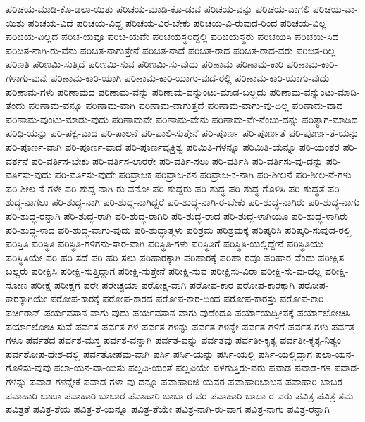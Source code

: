 {ಪರಿಚಯ-ಮಾಡಿ-ಕೊ-ಡಲಾ-ಯಿತು
ಪರಿಚಯ-ಮಾಡಿ-ಕೊ-ಡುವ
ಪರಿಚಯ-ವನ್ನು
ಪರಿಚಯ-ವಾಗಲಿ
ಪರಿಚಯ-ವಾ-ಯಿತು
ಪರಿಚಯ-ವಿದೆ
ಪರಿಚಯ-ವಿದ್ದ
ಪರಿಚಯ-ವಿರ-ಬೇಕು
ಪರಿಚಯ-ವಿ-ರುವುದ-ರಿಂದ
ಪರಿಚಯ-ವಿಲ್ಲ
ಪರಿಚಯ-ವಿಲ್ಲದ
ಪರಿಚ-ಯವೂ
ಪರಿಚ-ಯವೇ
ಪರಿಚಯಸ್ಥರಿದ್ದಲ್ಲಿ
ಪರಿಚಯಸ್ಥರು
ಪರಿಚಯಿಸಿ
ಪರಿಚಯಿ-ಸಿದ
ಪರಿಚಿತ-ನಾಗಿ-ರು-ವೆನು
ಪರಿಚಿತ-ನಾಗುತ್ತೇನೆ
ಪರಿಚಿತ-ನಾದೆ
ಪರಿಚಿತ-ರಾದ
ಪರಿಚಿತ-ರಾದ-ವರು
ಪರಿಚಿತ-ರಿಲ್ಲ
ಪರಿಣತಿ
ಪರಿಣಮಿ-ಸುತ್ತಿದೆ
ಪರಿಣಮಿ-ಸುವ
ಪರಿಣಮಿ-ಸು-ವುದು
ಪರಿಣಾಮ
ಪರಿಣಾಮ-ಕಾರಿ
ಪರಿಣಾಮ-ಕಾರಿ-ಗಳಾಗು-ವುವು
ಪರಿಣಾಮ-ಕಾರಿ-ಯಾಗಿ
ಪರಿಣಾಮ-ಕಾರಿ-ಯಾಗು-ವುದ-ರಲ್ಲಿ
ಪರಿಣಾಮ-ಕಾರಿ-ಯಾಗು-ವುದು
ಪರಿಣಾಮ-ಗಳು
ಪರಿಣಾಮದ
ಪರಿಣಾಮ-ವನ್ನು
ಪರಿಣಾಮ-ವನ್ನುಂಟು-ಮಾಡ-ಬಲ್ಲದು
ಪರಿಣಾಮ-ವನ್ನುಂಟು-ಮಾಡಿ-ತೆಂದು
ಪರಿಣಾಮ-ವನ್ನೂ
ಪರಿಣಾಮ-ವಾಗಿ
ಪರಿಣಾಮ-ವಾಗುತ್ತದೆ
ಪರಿಣಾಮ-ವಾಗು-ವು-ದಿಲ್ಲ
ಪರಿಣಾಮ-ವಾದ
ಪರಿಣಾಮ-ವುಂಟು-ಮಾಡು-ವುದು
ಪರಿಣಾಮವೇ
ಪರಿಣಾಮ-ವೇನು
ಪರಿಣಾಮ-ವೇ-ನೆಂಬು-ದನ್ನು
ಪರಿತ್ಯಾಗ-ಮಾಡಿದ
ಪರಿಧಿ-ಯನ್ನು
ಪರಿ-ಪಕ್ವ-ವಾದ
ಪರಿ-ಪಾಲನೆ
ಪರಿ-ಪಾಲಿ-ಸುತ್ತೇನೆ
ಪರಿ-ಪೂರ್ಣ
ಪರಿ-ಪೂರ್ಣತೆ
ಪರಿ-ಪೂರ್ಣ-ತೆ-ಯನ್ನು
ಪರಿ-ಪೂರ್ಣ-ವಾಗಿ
ಪರಿ-ಪೂರ್ಣ-ವಾದ
ಪರಿ-ಪೂರ್ಣವ್ಯಕ್ತಿತ್ವ
ಪರಿಮಿತಿ-ಗಳನ್ನೂ
ಪರಿಮಿತಿ-ಯನ್ನೂ
ಪರಿ-ಯಂತರ
ಪರಿ-ವರ್ತನೆ
ಪರಿ-ವರ್ತಿಸ-ಬೇಕು
ಪರಿ-ವರ್ತಿಸ-ಲಾರರೇ
ಪರಿ-ವರ್ತಿ-ಸಲು
ಪರಿ-ವರ್ತಿಸಿ
ಪರಿ-ವರ್ತಿಸು-ವು-ದನ್ನು
ಪರಿ-ವರ್ತಿಸು-ವುದು
ಪರಿ-ವರ್ತಿಸು-ವುದೇ
ಪರಿವ್ರಾಜಕ
ಪರಿವ್ರಾಜ-ಕನ
ಪರಿವ್ರಾಜ-ಕ-ನಾಗಿ
ಪರಿ-ಶೀಲನೆ
ಪರಿ-ಶೀಲ-ನೆ-ಗಳು
ಪರಿ-ಶೀಲ-ನೆ-ಗಳೇ
ಪರಿ-ಶುದ್ದ-ನಾಗಿ-ರು-ವನೋ
ಪರಿ-ಶುದ್ದರು
ಪರಿ-ಶುದ್ಧ
ಪರಿ-ಶುದ್ಧ-ಗೊಳಿಸಿ
ಪರಿ-ಶುದ್ಧತೆ
ಪರಿ-ಶುದ್ಧ-ನಾಗಲು
ಪರಿ-ಶುದ್ಧ-ನಾಗಿ
ಪರಿ-ಶುದ್ಧ-ನಾಗಿದ್ದರೆ
ಪರಿ-ಶುದ್ಧ-ನಾಗಿ-ರ-ಬೇಕು
ಪರಿ-ಶುದ್ಧ-ನಾಗಿರು
ಪರಿ-ಶುದ್ಧ-ನಾಗು
ಪರಿ-ಶುದ್ಧ-ರನ್ನಾಗಿ
ಪರಿ-ಶುದ್ಧ-ರಾಗಿ
ಪರಿ-ಶುದ್ಧ-ರಾಗಿರಿ
ಪರಿ-ಶುದ್ಧ-ರಾದ
ಪರಿ-ಶುದ್ಧ-ಳಾಗಿಯೂ
ಪರಿ-ಶುದ್ಧ-ಳಾಗಿರು
ಪರಿ-ಶುದ್ಧ-ಳಾದ
ಪರಿ-ಶುದ್ಧ-ವಾಗು-ವುದು
ಪರಿ-ಶುದ್ಧಾತ್ಮಳು
ಪರಿಶ್ರಮ
ಪರಿಶ್ರಮಕ್ಕೆ
ಪರಿಷ್ಕರಿಸಿ
ಪರಿಷ್ಕರಿ-ಸುವುದ-ರಲ್ಲಿ
ಪರಿಸ್ತಿತಿ
ಪರಿಸ್ಥಿತಿ
ಪರಿಸ್ಥಿತಿ-ಗಳಿಗನು-ಸಾರ-ವಾಗಿ
ಪರಿಸ್ಥಿತಿ-ಗಳು
ಪರಿಸ್ಥಿತಿಗೆ
ಪರಿಸ್ಥಿತಿ-ಯಲ್ಲಿದ್ದೇನೆ
ಪರಿಸ್ಥಿತಿಯು
ಪರಿಸ್ಥಿತಿಯೇ
ಪರಿ-ಹರಿ-ಸದೆ
ಪರಿ-ಹರಿ-ಸಲು
ಪರಿಹಾರಕ್ಕಾಗಿ
ಪರಿಹಾರಕ್ಕೆ
ಪರಿಹಾ-ರವೂ
ಪರಿಹಾರ-ವೆಂದು
ಪರೀಕ್ಷಿಸ-ಬಲ್ಲರು
ಪರೀಕ್ಷಿಸಿ
ಪರೀಕ್ಷಿ-ಸುತ್ತಿದ್ದಾಗ
ಪರೀಕ್ಷಿ-ಸುತ್ತೇನೆ
ಪರೀಕ್ಷಿ-ಸುವ
ಪರೀಕ್ಷಿಸು-ವಿರಾ
ಪರೀಕ್ಷಿ-ಸು-ವು-ದಲ್ಲ
ಪರೀಕ್ಷಿ-ಸೋಣ
ಪರೀಕ್ಷೆ
ಪರೀಕ್ಷೆಗೆ
ಪರೇ
ಪರೇಚ್ಛಯಾ
ಪರೋಕ್ಷ-ವಾಗಿ
ಪರೋಪ-ಕಾರ
ಪರೋಪ-ಕಾರಕ್ಕಾಗಿ
ಪರೋಪ-ಕಾರಕ್ಕಾಗಿಯೇ
ಪರೋಪ-ಕಾರಕ್ಕೆ
ಪರೋಪ-ಕಾರದ
ಪರೋಪ-ಕಾರ-ದಿಂದ
ಪರೋಪ-ಕಾರಸ್ತು
ಪರೋಪ-ಕಾರಿ
ಪರ್ಚಿರಾನ್
ಪರ್ಯವಸಾನ-ವಾಗು-ವುದು
ಪರ್ಯವಸಾನ-ವಾಗು-ವುದೆಂದೂ
ಪರ್ಯಾಯದ್ವೀಪಕ್ಕೆ
ಪರ್ಯಾಲೋಚಿಸಿ
ಪರ್ಯಾಲೋಚಿ-ಸುವೆ
ಪರ್ವತ
ಪರ್ವತ-ಗಳ
ಪರ್ವತ-ಗಳನ್ನು
ಪರ್ವತ-ಗಳನ್ನೇ
ಪರ್ವತ-ಗಳಿಗೆ
ಪರ್ವತ-ಗಳು
ಪರ್ವತ-ಗಳೂ
ಪರ್ವತದ
ಪರ್ವತ-ಮಸ್ತ
ಪರ್ವತ-ವನ್ನಾಗಿ
ಪರ್ವತ-ವನ್ನು
ಪರ್ವತವು
ಪರ್ವತೀ-ಕೃತ್ಯ
ಪರ್ವತೀ-ಕೃತ್ಯ-ನಿತ್ಯಂ
ಪರ್ವತೋಪ-ದೇಶ-ದಲ್ಲಿ
ಪರ್ವತೋಪಮ-ವಾಗಿ
ಪರ್ಸಿ
ಪರ್ಸಿ-ಯನ್ನು
ಪರ್ಸಿ-ಯಲ್ಲಿ
ಪರ್ಸಿ-ಯಲ್ಲಿದ್ದಾಗ
ಪಲಾ-ಯನ-ಗೊಳಿಸು-ವುವು
ಪಲಾ-ಯನ-ವಾ-ಯಿತು
ಪಲ್ಲವಿ-ಯಂತೆ
ಪಲ್ಲವಿಯೇ
ಪಳಗುತ್ತಿರು-ವರು
ಪವಾಡ
ಪವಾಡ-ಗಳ
ಪವಾಡ-ಗಳನ್ನು
ಪವಾಡ-ಗಳನ್ನೇಕೆ
ಪವಾಡ-ಗಳಾ-ವು-ದನ್ನೂ
ಪವಾಹಾರಿಜಿ-ಯವರ
ಪವಾಹಾರಿಬಾಬನ
ಪವಾಹಾರಿ-ಬಾಬರ
ಪವಾಹಾರಿ-ಬಾಬಾ
ಪವಾಹಾರಿ-ಬಾಬಾರ
ಪವಾಹಾರಿ-ಬಾಬಾ-ರ-ವರ
ಪವಾಹಾರಿ-ಬಾಬಾ-ರ-ವರು
ಪವಿತ್ರ
ಪವಿತ್ರ-ತಮ
ಪವಿತ್ರತೆ
ಪವಿತ್ರ-ತೆಯ
ಪವಿತ್ರ-ತೆ-ಯನ್ನೂ
ಪವಿತ್ರ-ತೆಯೇ
ಪವಿತ್ರ-ನಾಗಿ-ರು-ವಾಗ
ಪವಿತ್ರ-ನಾಗು
ಪವಿತ್ರ-ರನ್ನಾಗಿ
}
